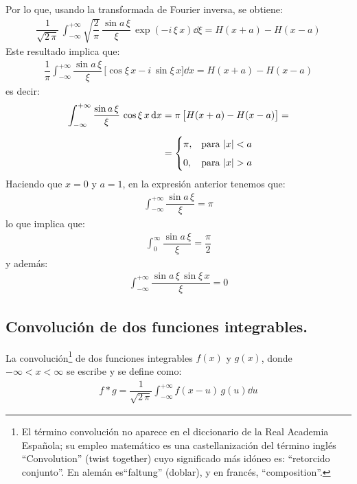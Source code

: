 Por lo que, usando la transformada de Fourier inversa, se obtiene:
\begin{align*}
\dfrac{1}{\sqrt{2 \, \pi}} \, \int_{-\infty}^{+\infty} \sqrt{\dfrac{2}{\pi}} \, \dfrac{\sin a \, \xi}{\xi} \,  \exp(- i \, \xi \, x) \dd{\xi}  = H(x + a) - H(x- a)
\end{align*}
Este resultado implica que:
\begin{align*}
\dfrac{1}{\pi} \int_{-\infty}^{+\infty} \dfrac{\sin a \, \xi}{\xi} \, \big[\cos \xi \, x - i \, \sin \xi \, x \big] \dd{x} = H(x + a) - H(x - a)
\end{align*}
es decir:
\begin{align*}
\int_{-\infty}^{+\infty} \dfrac{\sin a \, \xi}{\xi} \, \cos \xi \, x \dd{x} &= \pi \, \big[H(x + a) - H(x - a)\big]  = \\[0.5em]
&= \begin{cases}
\pi, & \mbox{para  } \abs{x} < a \\[0.5em]
0, & \mbox{para  } \abs{x} > a
\end{cases}
\end{align*}
Haciendo que $x = 0$ y $a = 1$, en la expresión anterior tenemos que:
\begin{align*}
\int_{-\infty}^{+\infty} \dfrac{\sin a \, \xi}{\xi} = \pi
\end{align*}
lo que implica que:
\begin{align*}
\int_{0}^{\infty} \dfrac{\sin a \, \xi}{\xi} = \dfrac{\pi}{2}
\end{align*}
y además:
\begin{align*}
\int_{-\infty}^{+\infty} \dfrac{\sin a \, \xi \, \sin \xi \, x}{\xi} = 0
\end{align*}

\subsection{Convolución de dos funciones integrables.}

La convolución\footnote{El término convolución no aparece en el diccionario de la Real Academia Española; su empleo matemático es una castellanización del término inglés \enquote{Convolution} (twist together) cuyo significado más idóneo es: \enquote{retorcido conjunto}. En alemán es\enquote{faltung} (doblar), y en francés, \enquote{composition}.} de dos funciones integrables $f(x)$ y $g(x)$, donde \hfill \break
$-\infty < x < \infty$ se escribe y se define como:
\begin{align}
f * g = \dfrac{1}{\sqrt{2 \, \pi}} \int_{-\infty}^{+\infty} f(x - u) \, g(u) \dd{u}
\label{eq:ecuacion_01_23}
\end{align}

